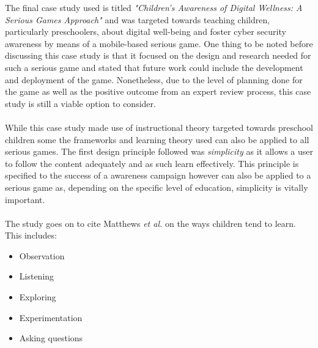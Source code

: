 \documentclass[conference]{IEEEtran}
\begin{document}
The final case study used is titled \textit{"Children’s Awareness of Digital Wellness: A Serious Games Approach"} and was targeted towards teaching children, particularly preschoolers, about digital well-being and foster cyber security awareness by means of a mobile-based serious game\cite{allers2021children}. One thing to be noted before discussing this case study is that it focused on the design and research needed for such a serious game and stated that future work could include the development and deployment of the game\cite{allers2021children}. Nonetheless, due to the level of planning done for the game as well as the positive outcome from an expert review process, this case study is still a viable option to consider. 
\\\\
While this case study\cite{allers2021children} made use of instructional theory targeted towards preschool children\cite{matthews2007,callaghan2018} some the frameworks and learning theory used can also be applied to all serious games. The first design principle followed was \textit{simplicity} as it allows a user to follow the content adequately and as such learn effectively\cite{allers2021children}. This principle is specified to the success of a awareness campaign however can also be applied to a serious game as, depending on the specific level of education, simplicity is vitally important. 
\\\\
The study goes on to cite Matthews \textit{et al.}\cite{matthews2007} on the ways children tend to learn. This includes:
\begin{itemize}
\item Observation
\item Listening
\item Exploring
\item Experimentation
\item Asking questions
\end{itemize}
\end{document}
